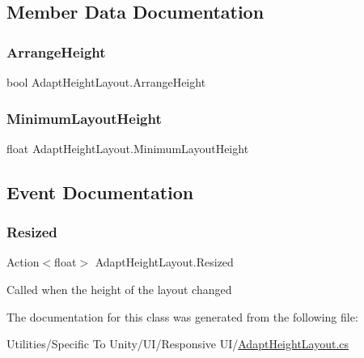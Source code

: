 \subsection{Member Data Documentation}
\mbox{\label{class_adapt_height_layout_a8f9f7bd6ffb287526031e84152bf01a6}} 
\subsubsection{\texorpdfstring{Arrange\+Height}{ArrangeHeight}}
{\footnotesize\ttfamily bool Adapt\+Height\+Layout.\+Arrange\+Height}

\mbox{\label{class_adapt_height_layout_ac867333b5e74e0e67b0014eaf5fb7105}} 
\subsubsection{\texorpdfstring{Minimum\+Layout\+Height}{MinimumLayoutHeight}}
{\footnotesize\ttfamily float Adapt\+Height\+Layout.\+Minimum\+Layout\+Height}



\subsection{Event Documentation}
\mbox{\label{class_adapt_height_layout_a47821908008228db52d74048bb16d96a}} 
\subsubsection{\texorpdfstring{Resized}{Resized}}
{\footnotesize\ttfamily Action$<$float$>$ Adapt\+Height\+Layout.\+Resized}



Called when the height of the layout changed 



The documentation for this class was generated from the following file\+:\begin{DoxyCompactItemize}
\item 
Utilities/\+Specific To Unity/\+U\+I/\+Responsive U\+I/\hyperlink{_adapt_height_layout_8cs}{Adapt\+Height\+Layout.\+cs}\end{DoxyCompactItemize}
